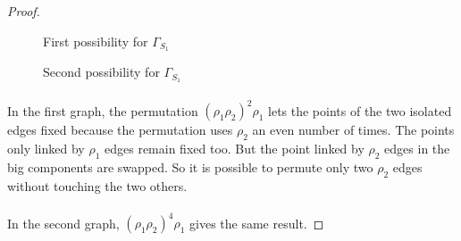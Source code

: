 \begin{proof}
\begin{figure}[H]
\begin{center}
\begin{tikzpicture}[scale=.8]
      \end{tikzpicture}
      \caption{First possibility for $\Gamma_{S_1}$}
    \end{center}
  \end{figure}

  \begin{figure}[H]
    \begin{center}
      \caption{Second possibility for $\Gamma_{S_1}$}
    \end{center}
  \end{figure}

  \paragraph{}
  In the first graph, the permutation $(\rho_1 \rho_2)^2 \rho_1$ lets the points of the two isolated edges fixed because the permutation uses $\rho_2$ an even number of times. The points only linked by $\rho_1$ edges remain fixed too. But the point linked by $\rho_2$ edges in the big components are swapped. So it is possible to permute only two $\rho_2$ edges without touching the two others.

  \paragraph{}
  In the second graph, $(\rho_1\rho_2)^4 \rho_1$ gives the same result.


\end{proof}
